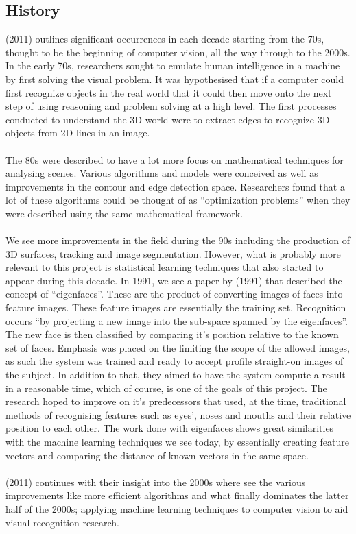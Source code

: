 \documentclass{article}
\begin{document}
 \subsection{History}
 \citeauthor{SzeliskiRichard2011CV:A} (2011) outlines significant occurrences in each decade starting from the 70s, 
 thought to be the beginning of 
 computer vision, all the way through to the 2000s. In the early 70s, researchers sought to emulate human intelligence 
 in a machine by first solving the visual problem. It was hypothesised that if a computer could first recognize objects 
 in the real world that it could then move onto the next step of using reasoning and problem solving at a high level. 
 The first processes conducted to understand the 3D world were to extract edges to recognize 3D objects from 2D lines in
  an image.
  \\
  \\
  The 80s were described to have a lot more focus on mathematical techniques for analysing scenes. Various algorithms 
  and models were conceived as well as improvements in the contour and edge detection space. Researchers found that a 
  lot of these algorithms could be thought of as “optimization problems” when they were described using the same 
  mathematical framework.
  \\
  \\
  We see more improvements in the field during the 90s including the production of 3D surfaces, tracking and image 
  segmentation. However, what is probably more relevant to this project is statistical learning techniques that also 
  started to appear during this decade. In 1991, we see a paper by \citeauthor{turk1991face} (1991) that described
   the concept of “eigenfaces”. These are the product of converting images of faces into feature images. These feature 
   images are essentially the training set. Recognition occurs “by projecting a new image into the sub-space spanned by 
   the eigenfaces”. The new face is then classified by comparing it’s position relative to the known set of faces. 
   Emphasis was placed on the limiting the scope of the allowed images, as such the system was trained and ready to 
   accept profile straight-on images of the subject. In addition to that, they aimed to have the system compute a result
    in a reasonable time, which of course, is one of the goals of this project. The research hoped to improve on it’s 
    predecessors that used, at the time, traditional methods of recognising features such as eyes’, noses and mouths and 
    their relative position to each other. The work done with eigenfaces shows great similarities with the machine 
    learning techniques we see today, by essentially creating feature vectors and comparing the distance of known 
    vectors in the same space.
\\
\\
\citeauthor{SzeliskiRichard2011CV:A} (2011) continues with their insight into the 2000s where see the various improvements
 like more efficient 
algorithms and what finally dominates the latter half of the 2000s; applying machine learning techniques to computer
    vision to aid visual recognition research.
\end{document}
